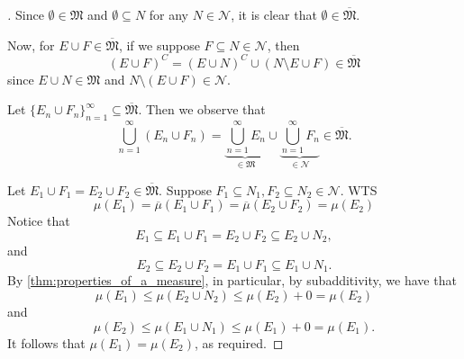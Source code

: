\documentclass[notoc,notitlepage]{tufte-book}
\begin{document}
\begin{proof}[]
  Since $\emptyset \in \mathfrak{M}$ and $\emptyset \subseteq N$
  for any $N \in \mathcal{N}$,
  it is clear that $\emptyset \in \overline{\mathfrak{M}}$.

  Now, for $E \cup F \in \overline{\mathfrak{M}}$,
  if we suppose $F \subseteq N \in \mathcal{N}$, then
  \begin{equation*}
    \left( E \cup F \right)^C
    = \left( E \cup N \right)^C \cup \left( N \setminus E \cup F \right)
    \in \overline{\mathfrak{M}}
  \end{equation*}
  since $E \cup N \in \mathfrak{M}$ and $N \setminus (E \cup F) \in \mathcal{N}$.

  Let $\{ E_n \cup F_n \}_{n=1}^{\infty} \subseteq \overline{\mathfrak{M}}$.
  Then we observe that
  \begin{equation*}
    \bigcup_{n=1}^{\infty} (E_n \cup F_n)
    = \underbrace{\bigcup_{n=1}^{\infty} E_n}_{\in \mathfrak{M}}
      \cup \underbrace{\bigcup_{n=1}^{\infty} F_n}_{\in \mathcal{N}}
    \in \overline{\mathfrak{M}}.
  \end{equation*}

  \noindent
  Let $E_1 \cup F_1 = E_2 \cup F_2 \in \overline{\mathfrak{M}}$.
  Suppose $F_1 \subseteq N_1, F_2 \subseteq N_2 \in \mathcal{N}$.
  WTS
  \begin{equation*}
    \mu(E_1) = \overline{\mu}(E_1 \cup F_1)
          = \overline{\mu}(E_2 \cup F_2) = \mu(E_2)
  \end{equation*}
  Notice that
  \begin{equation*}
    E_1 \subseteq E_1 \cup F_1 = E_2 \cup F_2 \subseteq E_2 \cup N_2,
  \end{equation*}
  and
  \begin{equation*}
    E_2 \subseteq E_2 \cup F_2 = E_1 \cup F_1 \subseteq E_1 \cup N_1.
  \end{equation*}
  By \cref{thm:properties_of_a_measure}, in particular,
  by subadditivity,
  we have that
  \begin{equation*}
    \mu(E_1) \leq \mu(E_2 \cup N_2) \leq \mu(E_2) + 0 = \mu(E_2)
  \end{equation*}
  and
  \begin{equation*}
    \mu(E_2) \leq \mu(E_1 \cup N_1) \leq \mu(E_1) + 0 = \mu(E_1).
  \end{equation*}
  It follows that $\mu(E_1) = \mu(E_2)$, as required.


\end{proof}
\end{document}
